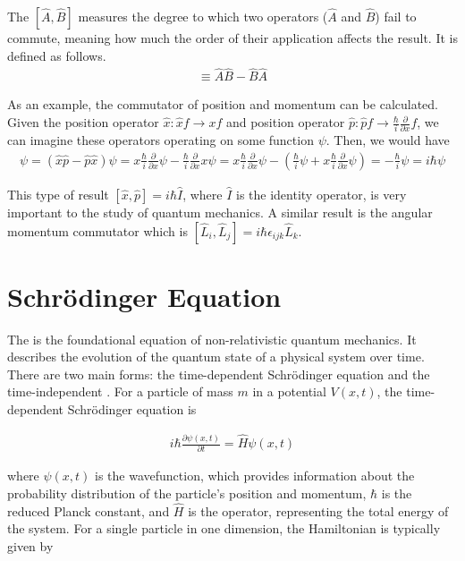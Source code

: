 \begin{defn}{1}
	The  $[\hat{A},\hat{B}]$ measures the degree to which two operators ($\hat{A}$ and $\hat{B}$) fail to commute, meaning how much the order of their application affects the result. It is defined as follows.
\begin{align}
[\hat{A},\hat{B}] \equiv \hat{A}\hat{B} - \hat{B}\hat{A}
\end{align}
\end{defn}

As an example, the commutator of position and momentum can be calculated. Given the position operator $\hat{x}: \hat{x}f \rightarrow xf$ and position operator $\hat{p}: \hat{p}f \rightarrow \frac{\hbar}{i}\frac{\partial}{\partial x} f$, we can imagine these operators operating on some function $\psi$. Then, we would have
\begin{align}
[\hat{x},\hat{p}]\psi = (\hat{x}\hat{p} - \hat{p}\hat{x})\psi = x\frac{\hbar}{i}\frac{\partial}{\partial x}\psi - \frac{\hbar}{i}\frac{\partial}{\partial x}x\psi = x\frac{\hbar}{i}\frac{\partial}{\partial x}\psi - \left(\frac{\hbar}{i}\psi + x\frac{\hbar}{i}\frac{\partial}{\partial x}\psi\right) = -\frac{\hbar}{i}\psi = i\hbar\psi
\end{align}

This type of result $[\hat{x},\hat{p}] = i\hbar\hat{I}$, where $\hat{I}$ is the identity operator, is very important to the study of quantum mechanics. A similar result is the angular momentum commutator which is $[\hat{L}_i,\hat{L}_j] = i\hbar\epsilon_{ijk}\hat{L}_k$.

\section{Schrödinger Equation}

The  is the foundational equation of non-relativistic quantum mechanics. It describes the evolution of the quantum state of a physical system over time. There are two main forms: the time-dependent Schrödinger equation and the time-independent . For a particle of mass $m$ in a potential $V(x,t)$, the time-dependent Schrödinger equation is

\begin{align}
i\hbar \frac{\partial \psi(x,t)}{\partial t} = \hat{H} \psi(x,t)
\end{align}

where $\psi(x, t)$ is the wavefunction, which provides information about the probability distribution of the particle's position and momentum, $\hbar$ is the reduced Planck constant, and $\hat{H}$ is the  operator, representing the total energy of the system. For a single particle in one dimension, the Hamiltonian is typically given by


